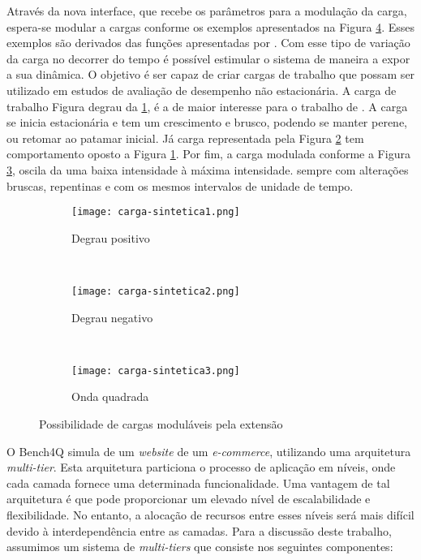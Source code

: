 Através da nova interface, que recebe os parâmetros para a modulação da carga, espera-se modular a cargas conforme os exemplos apresentados na Figura	\ref{fig:cargas-moduladas-exemplos}. Esses exemplos são derivados das funções apresentadas por . Com esse tipo de variação da carga no decorrer do tempo é possível estimular o sistema de maneira a expor a sua dinâmica. O objetivo é ser capaz de criar cargas de trabalho que possam ser utilizado em estudos de avaliação de desempenho não estacionária. 
A carga de trabalho Figura degrau da \ref{fig:degrau-positivo}, é a de maior interesse para o trabalho de . A carga se inicia estacionária e tem um crescimento e brusco, podendo se manter perene, ou retomar ao patamar inicial. Já carga representada pela Figura \ref{fig:degrau-negativo} tem comportamento oposto a Figura \ref{fig:degrau-positivo}. Por fim, a carga modulada conforme a Figura \ref{fig:onda-gradrada}, oscila da uma baixa intensidade à máxima intensidade. sempre com alterações bruscas, repentinas e com os mesmos intervalos de unidade de tempo.
 
\begin{figure}[!htb]
	\centering
	\begin{subfigure}[b]{0.35\textwidth}
		\texttt{[image: carga-sintetica1.png]}
		\caption{Degrau positivo}
		\label{fig:degrau-positivo}
	\end{subfigure}
	~
	\begin{subfigure}[b]{0.35\textwidth}
		\texttt{[image: carga-sintetica2.png]}
		\caption{Degrau negativo}
		\label{fig:degrau-negativo}
	\end{subfigure}
	~
	\begin{subfigure}[b]{0.35\textwidth}
		\texttt{[image: carga-sintetica3.png]}
		\caption{Onda quadrada}
		\label{fig:onda-gradrada}
	\end{subfigure}
	\caption{Possibilidade de cargas moduláveis pela extensão}
	\label{fig:cargas-moduladas-exemplos}
\end{figure}


O Bench4Q simula de um \textit{website} de um \textit{e-commerce}, utilizando uma arquitetura \textit{multi-tier}. Esta arquitetura particiona o processo de aplicação em níveis, onde cada camada fornece uma determinada funcionalidade. Uma vantagem de tal arquitetura é que pode proporcionar um elevado nível de escalabilidade e flexibilidade. No entanto, a alocação de recursos entre esses níveis será mais difícil devido à interdependência entre as camadas. Para a discussão deste trabalho, assumimos um sistema de \textit{multi-tiers} que consiste nos seguintes componentes:

